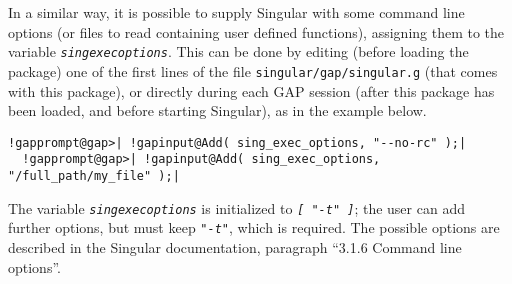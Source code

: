 \documentclass[a4paper,11pt]{report}
\begin{document}
{{{ In a similar way, it is possible to supply \textsf{Singular} with some command line options (or files to read containing user defined
functions), assigning them to the variable \mbox{\texttt{\mdseries\slshape sing{\textunderscore}exec{\textunderscore}options}}. This can be done by editing (before loading the package) one of the first
lines of the file \texttt{singular/gap/singular.g} (that comes with this package), or directly during each \textsf{GAP} session (after this package has been loaded, and before starting \textsf{Singular}), as in the example below. 
\begin{Verbatim}[commandchars=!@|,fontsize=\small,frame=single,label=Example]
  !gapprompt@gap>| !gapinput@Add( sing_exec_options, "--no-rc" );|
  !gapprompt@gap>| !gapinput@Add( sing_exec_options, "/full_path/my_file" );|
\end{Verbatim}
 The variable \mbox{\texttt{\mdseries\slshape sing{\textunderscore}exec{\textunderscore}options}} is initialized to \mbox{\texttt{\mdseries\slshape [ "-t" ]}}; the user can add further options, but must keep \mbox{\texttt{\mdseries\slshape "-t"}}, which is required. The possible options are described in the \textsf{Singular} documentation, paragraph ``3.1.6 Command line options''. 

}}}
\end{document}
